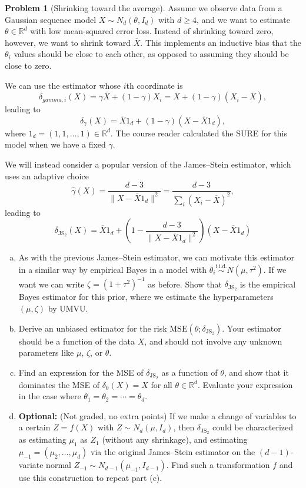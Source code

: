 \documentclass{article}
\newcommand{\RR}{\mathbb{R}}
\newcommand{\simiid}{\overset{\text{i.i.d.}}{\sim}}
\newcommand{\optional}{{\bf Optional:} (Not graded, no extra points) }
\theoremstyle{definition}
\newtheorem{problem}{Problem}
\begin{document}
\begin{problem}[Shrinking toward the average]

  Assume we observe data from a Gaussian sequence model $X \sim N_d(\theta, I_d)$ with $d \geq 4$, and we want to estimate $\theta\in \RR^d$ with low mean-squared error loss. Instead of shrinking toward zero, however, we want to shrink toward $\overline{X}$. This implements an inductive bias that the $\theta_i$ values should be close to each other, as opposed to assuming they should be close to zero.

We can use the estimator whose $i$th coordinate is
\[
\delta_{gamma,i}(X) = \gamma \overline{X} + (1-\gamma) X_i = \overline{X} + (1-\gamma)(X_i - \overline{X}),
\]
leading to 
\[
\delta_{\gamma}(X) = \overline{X} 1_d + (1-\gamma)(X - \overline{X}1_d),
\]
where $1_d = (1,1,\ldots,1) \in \RR^d$. The course reader calculated the SURE for this model when we have a fixed $\gamma$.

We will instead consider a popular version of the James--Stein estimator, which uses an adaptive choice
\[
\hat\gamma(X) = \frac{d-3}{\|X - \overline{X} 1_d\|^2} = \frac{d-3}{\sum_i (X_i - \overline{X})^2},
\]
leading to
\[
\delta_{\text{JS}_2}(X) = \overline{X} 1_d + \left(1 - \frac{d-3}{\|X - \overline{X} 1_d\|^2}\right) (X - \overline{X} 1_d)
\]

\begin{enumerate}[(a)]
\item As with the previous James--Stein estimator, we can motivate this estimator in a similar way by empirical Bayes in a model with $\theta_i \simiid N(\mu, \tau^2)$. If we want we can write $\zeta = (1+\tau^2)^{-1}$ as before. Show that $\delta_{\text{JS}_2}$ is the empirical Bayes estimator for this prior, where we estimate the hyperparameters $(\mu,\zeta)$ by UMVU.

\item Derive an unbiased estimator for the risk $\text{MSE}(\theta; \delta_{\text{JS}_2})$. Your estimator should be a function of the data $X$, and should not involve any unknown parameters like $\mu$, $\zeta$, or $\theta$.

\item Find an expression for the MSE of $\delta_{\text{JS}_2}$ as a function of $\theta$, and show that it dominates the MSE of $\delta_0(X) = X$ for all $\theta \in \RR^d$. Evaluate your expression in the case where $\theta_1 = \theta_2 = \cdots = \theta_d$.

\item \optional If we make a change of variables to a certain $Z = f(X)$ with $Z \sim N_d(\mu, I_d)$, then $\delta_{\text{JS}_2}$ could be characterized as estimating $\mu_1$ as $Z_1$ (without any shrinkage), and estimating $\mu_{-1}=(\mu_2,\ldots,\mu_d)$ via the original James--Stein estimator on the $(d-1)$-variate normal $Z_{-1} \sim N_{d-1}(\mu_{-1},I_{d-1})$. Find such a transformation $f$ and use this construction to repeat part (c).
\end{enumerate}

\end{problem}
\end{document}
